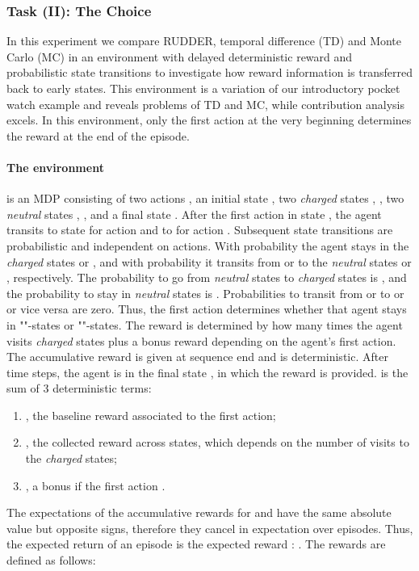 \documentclass{article}
\begin{document}
\begin{appendices}
\subsubsection{Task (II): The Choice}
\label{c:thechoice}
In this experiment we compare RUDDER, temporal difference (TD) and Monte Carlo (MC) in 
an environment with delayed deterministic reward 
and probabilistic state transitions to investigate how reward information
is transferred back to early states.
This environment is a variation of our introductory
pocket watch example and reveals problems of TD and MC,
while contribution analysis excels. 
In this environment, only the first action at the very beginning 
determines the reward at the end of the episode.

\paragraph{ The environment} is an MDP consisting of two actions ,
an initial state , two {\em charged} states , , 
two {\em neutral} states , , and a final state .
After the first action  in state ,
the agent transits to state  for action  and to  for 
action . 
Subsequent state transitions are probabilistic and independent on actions. 
With probability  the agent stays in the {\em charged} states  or ,
and with probability  it transits from  or 
to the {\em neutral} states  or , respectively. 
The probability to go from {\em neutral} states 
to {\em charged} states is , 
and the probability to stay in {\em neutral} states is . 
Probabilities to transit from 
 or  to  or  or vice versa are zero.
Thus, the first action determines whether that agent stays in ""-states or 
""-states.
The reward is determined by how many times the agent visits {\em charged} states 
plus a bonus reward depending on the agent's first action.
The accumulative reward is given at sequence end and is deterministic.
After  time steps, the agent is in the final state , 
in which the reward  is provided.
  is the sum of 3 deterministic terms: 
 \begin{enumerate}
     \item , the baseline reward associated to the first action; 
     \item , the collected reward across states, 
     which depends on the number of visits  to the {\em charged} states;
     \item , a bonus if the first action .
 \end{enumerate}
The expectations of the accumulative rewards for  and  
have the same absolute value but opposite signs, 
therefore they cancel in expectation over episodes.
Thus, the expected return of an episode is the expected reward : . 
The rewards are defined as follows:


\end{appendices}
\end{document}
